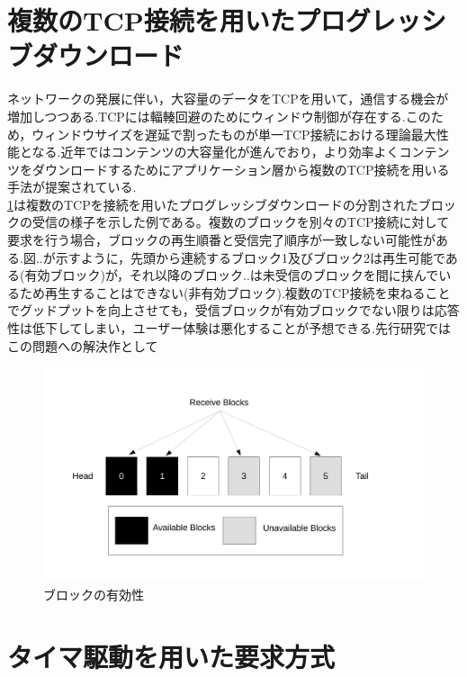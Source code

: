 \documentclass[a4j,12pt]{gradthesis_utf8}
\begin{document}
 \section{複数のTCP接続を用いたプログレッシブダウンロード}
 ネットワークの発展に伴い，大容量のデータをTCPを用いて，通信する機会が増加しつつある.TCPには輻輳回避のためにウィンドウ制御が存在する.このため，ウィンドウサイズを遅延で割ったものが単一TCP接続における理論最大性能となる.近年ではコンテンツの大容量化が進んでおり，より効率よくコンテンツをダウンロードするためにアプリケーション層から複数のTCP接続を用いる手法が提案されている.\\
 \ref{block}は複数のTCPを接続を用いたプログレッシブダウンロードの分割されたブロックの受信の様子を示した例である。複数のブロックを別々のTCP接続に対して要求を行う場合，ブロックの再生順番と受信完了順序が一致しない可能性がある.図..が示すように，先頭から連続するブロック1及びブロック2は再生可能である(有効ブロック)が，それ以降のブロック..は未受信のブロックを間に挟んでいるため再生することはできない(非有効ブロック).複数のTCP接続を束ねることでグッドプットを向上させても，受信ブロックが有効ブロックでない限りは応答性は低下してしまい，ユーザー体験は悪化することが予想できる.先行研究ではこの問題への解決作として
\begin{figure}[h]
\centering
\includegraphics[width=18cm]{block.pdf}
\caption{ブロックの有効性}
\label{block}
\end{figure}
 
 \section{タイマ駆動を用いた要求方式}
 
\end{document}

